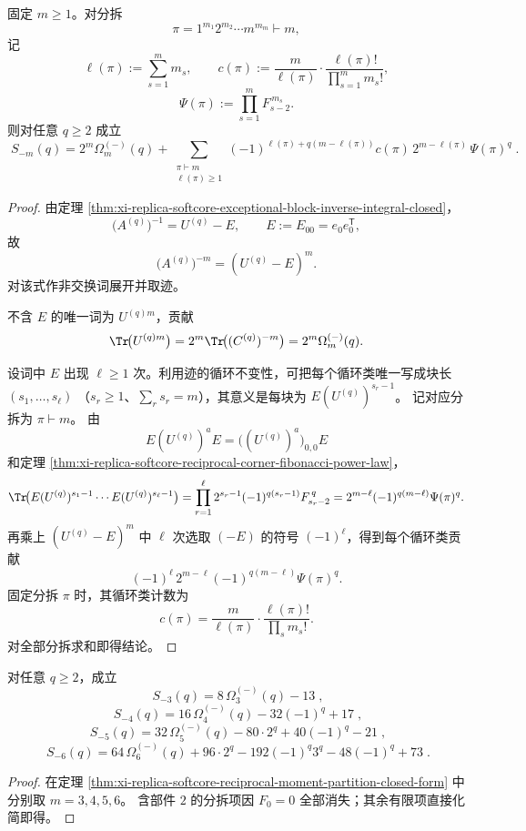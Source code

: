 \begin{theorem}\label{thm:xi-replica-softcore-reciprocal-moment-partition-closed-form}
固定 \(m\ge1\)。对分拆
\[
\pi=1^{m_1}2^{m_2}\cdots m^{m_m}\vdash m,
\]
记
\[
\ell(\pi):=\sum_{s=1}^{m}m_s,\qquad
c(\pi):=\frac{m}{\ell(\pi)}\cdot\frac{\ell(\pi)!}{\prod_{s=1}^{m}m_s!},
\]
\[
\Psi(\pi):=\prod_{s=1}^{m}F_{s-2}^{\,m_s}.
\]
则对任意 \(q\ge2\) 成立
\[
\boxed{\;
S_{-m}(q)
=2^m\Omega_m^{(-)}(q)
+\sum_{\substack{\pi\vdash m\\ \ell(\pi)\ge1}}
(-1)^{\ell(\pi)+q(m-\ell(\pi))}
c(\pi)\,2^{m-\ell(\pi)}\,\Psi(\pi)^q\; }.
\]
\end{theorem}
\begin{proof}
由定理 \ref{thm:xi-replica-softcore-exceptional-block-inverse-integral-closed}，
\[
\bigl(A^{(q)}\bigr)^{-1}=U^{(q)}-E,\qquad E:=E_{00}=e_0e_0^{\mathsf T},
\]
故
\[
\bigl(A^{(q)}\bigr)^{-m}=(U^{(q)}-E)^m.
\]
对该式作非交换词展开并取迹。

不含 \(E\) 的唯一词为 \(U^{(q)m}\)，贡献
\[
\Tr\!\bigl(U^{(q)m}\bigr)
=2^m\Tr\!\bigl((C^{(q)})^{-m}\bigr)
=2^m\Omega_m^{(-)}(q).
\]

设词中 \(E\) 出现 \(\ell\ge1\) 次。利用迹的循环不变性，可把每个循环类唯一写成块长
\(
(s_1,\dots,s_\ell)
\)
（\(s_r\ge1\)、\(\sum_r s_r=m\)），其意义是每块为 \(E(U^{(q)})^{s_r-1}\)。
记对应分拆为 \(\pi\vdash m\)。
由
\[
E(U^{(q)})^aE=\bigl((U^{(q)})^a\bigr)_{0,0}E
\]
和定理 \ref{thm:xi-replica-softcore-reciprocal-corner-fibonacci-power-law}，
\[
\Tr\!\bigl(E(U^{(q)})^{s_1-1}\cdots E(U^{(q)})^{s_\ell-1}\bigr)
=\prod_{r=1}^{\ell}2^{s_r-1}(-1)^{q(s_r-1)}F_{s_r-2}^{\,q}
=2^{m-\ell}(-1)^{q(m-\ell)}\Psi(\pi)^q.
\]
再乘上 \((U^{(q)}-E)^m\) 中 \(\ell\) 次选取 \((-E)\) 的符号 \((-1)^\ell\)，得到每个循环类贡献
\[
(-1)^\ell\,2^{m-\ell}(-1)^{q(m-\ell)}\Psi(\pi)^q.
\]
固定分拆 \(\pi\) 时，其循环类计数为
\[
c(\pi)=\frac{m}{\ell(\pi)}\cdot\frac{\ell(\pi)!}{\prod_s m_s!}.
\]
对全部分拆求和即得结论。
\end{proof}

\begin{corollary}[倒数三至六次矩的显式闭式]\label{cor:xi-replica-softcore-reciprocal-moment-m3-m6-closed}
对任意 \(q\ge2\)，成立
\[
\boxed{\;
S_{-3}(q)=8\,\Omega_3^{(-)}(q)-13\;},
\]
\[
\boxed{\;
S_{-4}(q)=16\,\Omega_4^{(-)}(q)-32(-1)^q+17\;},
\]
\[
\boxed{\;
S_{-5}(q)=32\,\Omega_5^{(-)}(q)-80\cdot 2^q+40(-1)^q-21\;},
\]
\[
\boxed{\;
S_{-6}(q)=64\,\Omega_6^{(-)}(q)+96\cdot 2^q-192(-1)^q3^q-48(-1)^q+73\; }.
\]
\end{corollary}
\begin{proof}
在定理 \ref{thm:xi-replica-softcore-reciprocal-moment-partition-closed-form} 中分别取 \(m=3,4,5,6\)。
含部件 \(2\) 的分拆项因 \(F_0=0\) 全部消失；其余有限项直接化简即得。
\end{proof}

